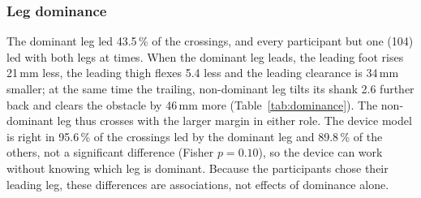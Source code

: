 \begin{table}[htbp]
\centering
\caption{The main models on the same crossings: balanced accuracy (95\,\% CI), macro F1 and Cohen's $\kappa$.}
\label{tab:statmodels}

\end{table}

\begin{table}[htbp]
\centering
\caption{Paired comparisons: difference in balanced accuracy (participant-bootstrap CI), crossings right for only one of the two
models, McNemar and Wilcoxon $p$ (Holm over the five pairs).}
\label{tab:statpairs}

\end{table}

\subsubsection{Leg dominance}

The dominant leg led 43.5\,\% of the crossings, and every participant but one (104) led with both legs at times. When the dominant
leg leads, the leading foot rises 21\,mm less, the leading thigh flexes 5.4\textdegree{} less and the leading clearance is 34\,mm
smaller; at the same time the trailing, non-dominant leg tilts its shank 2.6\textdegree{} further back and clears the obstacle by
46\,mm more (Table~\ref{tab:dominance}). The non-dominant leg thus crosses with the larger margin in either role. The device model
is right in 95.6\,\% of the crossings led by the dominant leg and 89.8\,\% of the others, not a significant difference (Fisher
$p = 0.10$), so the device can work without knowing which leg is dominant. Because the participants chose their leading leg,
these differences are associations, not effects of dominance alone.

\begin{table}[htbp]
\centering
\caption{Crossings led by the dominant minus the non-dominant leg (mixed models with height, width and a random height slope;
95\,\% CI, Satterthwaite $p$). For the trailing variables, the trailing leg is then the non-dominant one.}
\label{tab:dominance}

\end{table}
